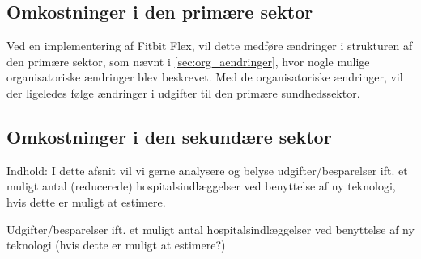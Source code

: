 \subsection{Omkostninger i den primære sektor}

Ved en implementering af Fitbit Flex, vil dette medføre ændringer i strukturen af den primære sektor, som nævnt i \autoref{sec:org_aendringer}, hvor nogle mulige organisatoriske ændringer blev beskrevet. Med de organisatoriske ændringer, vil der ligeledes følge ændringer i udgifter til den primære sundhedssektor. 



\subsection{Omkostninger i den sekundære sektor}
Indhold: I dette afsnit vil vi gerne analysere og belyse udgifter/besparelser ift. et muligt antal (reducerede) hospitalsindlæggelser ved benyttelse af ny teknologi, hvis dette er muligt at estimere. 

Udgifter/besparelser ift. et muligt antal hospitalsindlæggelser ved benyttelse af ny teknologi (hvis dette er muligt at estimere?)